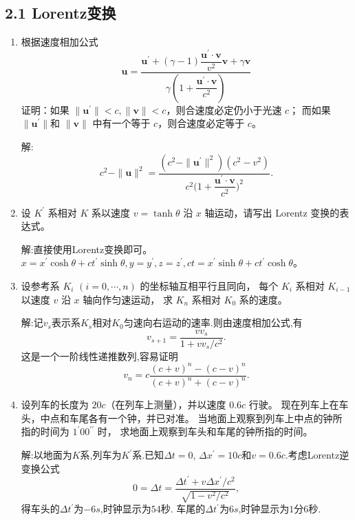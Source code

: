 \subsection{2.1 Lorentz变换}
\begin{enumerate}
    \item 根据速度相加公式
    $$\boldsymbol{u}=\frac{\boldsymbol{u}^{\prime}
    +(\gamma-1) \dfrac{\boldsymbol{u}^{\prime} \cdot \boldsymbol{v}}{v^2} \boldsymbol{v}
    +\gamma \boldsymbol{v}}{\gamma\left(1+\dfrac{\boldsymbol{u}^{\prime} \cdot \boldsymbol{v}}{c^2}\right)}$$
    证明：如果 $\|\boldsymbol{u}^{\prime}\|<c,\|\boldsymbol{v}\|<c$，则合速度必定仍小于光速 $c$；
    而如果 $\|\boldsymbol{u}^{\prime}\|$和 $\|\boldsymbol{v}\|$ 中有一个等于 $c$，则合速度必定等于 $c$。
    
    解:
    $$c^2-\|\boldsymbol{u}\|^2=\frac{(c^2-\|\boldsymbol{u}^{\prime}\|^2)(c^2-v^2)}{c^2\big(1+\dfrac{\boldsymbol{u}^{\prime}\cdot\boldsymbol{v}}{c^2}\big)^2}.$$

    \item 设 $K^{\prime}$ 系相对 $K$ 系以速度 $v=\tanh \theta$ 沿 $x$ 轴运动，请写出 Lorentz 变换的表达式。
    
    解:直接使用Lorentz变换即可。$x=x^{\prime} \cosh\theta+ct^{\prime} \sinh\theta, y=y^{\prime}, z=z^{\prime}, ct=x^{\prime} \sinh\theta+ct^{\prime} \cosh\theta$。

    \item 设参考系 $K_i$ $(i=0, \cdots, n)$ 的坐标轴互相平行且同向，
    每个 $K_i$ 系相对 $K_{i-1}$ 以速度 $v$ 沿 $x$ 轴向作匀速运动，
    求 $K_n$ 系相对 $K_0$ 系的速度。
    
    解:记$v_s$表示系$K_s$相对$K_0$匀速向右运动的速率.则由速度相加公式,有
    $$v_{s+1}=\frac{vv_s}{1+vv_s/c^2}.$$
    这是一个一阶线性递推数列,容易证明
    $$v_n=c\frac{(c+v)^n-(c-v)^n}{(c+v)^n+(c-v)^n}.$$

    \item 设列车的长度为 $20 c$（在列车上测量），并以速度 $0.6 c$ 行驶。
    现在列车上在车头，中点和车尾各有一个钟，并已对准。
    当地面上观察到列车上中点的钟所指的时间为 $1^{\prime} 00^{\prime \prime}$ 时，
    求地面上观察到车头和车尾的钟所指的时间。

    解:以地面为$K$系,列车为$K^{\prime}$系.已知$\Delta t=0$, $\Delta x^{\prime}=10c$和$v=0.6c$.考虑Lorentz逆变换公式
    $$0=\Delta t=\frac{\Delta t^{\prime}+v\Delta x^{\prime}/c^2}{\sqrt{1-v^2/c^2}},$$
    得车头的$\Delta t^{\prime}$为$-6s$,时钟显示为$54$秒.
    车尾的$\Delta t^{\prime}$为$6s$,时钟显示为$1$分$6$秒.
\end{enumerate}


